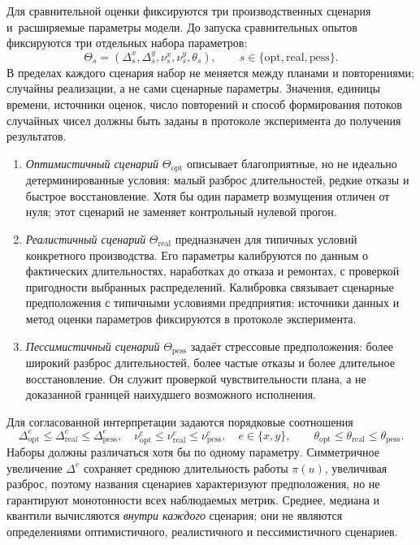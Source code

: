 Для сравнительной оценки фиксируются три производственных сценария и~расширяемые параметры модели. До запуска сравнительных опытов фиксируются три отдельных набора параметров:
\[
\Theta_s=(\Delta^x_s,\Delta^y_s,\nu^x_s,\nu^y_s,\theta_s),
\qquad s\in\{\mathrm{opt},\mathrm{real},\mathrm{pess}\}.
\]
В пределах каждого сценария набор не меняется между планами и повторениями; случайны реализации, а не сами сценарные параметры. Значения, единицы времени, источники оценок, число повторений и способ формирования потоков случайных чисел должны быть заданы в протоколе эксперимента до получения результатов.
\begin{enumerate}
  \item \emph{Оптимистичный сценарий} $\Theta_{\mathrm{opt}}$ описывает благоприятные, но не идеально детерминированные условия: малый разброс длительностей, редкие отказы и быстрое восстановление. Хотя бы один параметр возмущения отличен от нуля; этот сценарий не заменяет контрольный нулевой прогон.
  \item \emph{Реалистичный сценарий} $\Theta_{\mathrm{real}}$ предназначен для типичных условий конкретного производства. Его параметры калибруются по данным о фактических длительностях, наработках до отказа и ремонтах, с проверкой пригодности выбранных распределений. Калибровка связывает сценарные предположения с типичными условиями предприятия; источники данных и метод оценки параметров фиксируются в протоколе эксперимента.
  \item \emph{Пессимистичный сценарий} $\Theta_{\mathrm{pess}}$ задаёт стрессовые предположения: более широкий разброс длительностей, более частые отказы и более длительное восстановление. Он служит проверкой чувствительности плана, а не доказанной границей наихудшего возможного исполнения.
\end{enumerate}
Для согласованной интерпретации задаются порядковые соотношения
\[
\Delta^e_{\mathrm{opt}}\leq\Delta^e_{\mathrm{real}}\leq\Delta^e_{\mathrm{pess}},\quad
\nu^e_{\mathrm{opt}}\leq\nu^e_{\mathrm{real}}\leq\nu^e_{\mathrm{pess}},\quad e\in\{x,y\},
\qquad
\theta_{\mathrm{opt}}\leq\theta_{\mathrm{real}}\leq\theta_{\mathrm{pess}}.
\]
Наборы должны различаться хотя бы по одному параметру. Симметричное увеличение $\Delta^e$ сохраняет среднюю длительность работы $\pi(u)$, увеличивая разброс, поэтому названия сценариев характеризуют предположения, но не гарантируют монотонности всех наблюдаемых метрик. Среднее, медиана и квантили вычисляются \emph{внутри каждого} сценария; они не являются определениями оптимистичного, реалистичного и пессимистичного сценариев.

